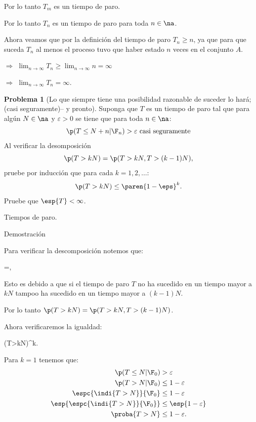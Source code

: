 \documentclass[a5paper,oneside]{amsart}
\theoremstyle{plain}
\theoremstyle{definition}
\newtheorem{problema}{Problema}
\begin{document}
Por lo tanto $T_m$ es un tiempo de paro.

Por lo tanto $T_n$ es un tiempo de paro para toda $n\in \na$.

Ahora veamos que por la definici\'on del tiempo de paro $T_n\geq n$, ya que para que suceda  $T_n$ al menos el  proceso tuvo que haber estado $n$ veces en el conjunto $A$.

$\Rightarrow$ $\lim_{n\rightarrow \infty} T_n \geq \lim_{n\rightarrow \infty} n=\infty$

$\Rightarrow$ $\lim_{n\rightarrow \infty} T_n =\infty$.

\begin{problema}[Lo que siempre tiene una posibilidad razonable de suceder lo har\'a; (casi seguramente)-- y pronto]

Suponga que \(T\) es un tiempo de paro tal que para alg\'un \(N\in\na\) y \(\varepsilon>0\) se tiene que para toda \(n\in\na\):
 $$
 \p (T\leq N+ n|\F_n)>\varepsilon \text{ casi seguramente}
 $$
Al verificar la desomposici\'on
 $$
\p (T>kN)= \p (T>kN,T>(k-1)N),
 $$pruebe por inducci\'on que para cada \(k=1,2,\ldots\):
 $$
\p (T>kN)\leq \paren{1-\eps}^k. 
 $$Pruebe que \( \esp{T}<\infty \).
 
  Tiempos de paro.
\end{problema}

Demostraci\'on

Para verificar la descomposici\'on notemos que:
\begin{esn}
=,
\end{esn}

Esto es debido a que si el tiempo de paro $T$ no ha sucedido en un tiempo mayor a $kN$ tampoo ha sucedido en un tiempo mayor a $(k-1)N$.

Por lo tanto $\p (T>kN)= \p (T>kN,T>(k-1)N)$.

Ahora verificaremos la igualdad:
\begin{esn}
\p (T>kN)\leq {}^k.
\end{esn}

Para $k=1$ tenemos que:
\begin{align}
\p (T\leq N|\F_0) &>\varepsilon \notag \\
\p (T> N|\F_0)&\leq 1-\varepsilon \notag \\
\espc{\indi{T> N}}{\F_0} &\leq  1-\varepsilon \notag \\
\esp{\espc{\indi{T> N}}{\F_0}} &\leq \esp{ 1-\varepsilon} \notag \\
\proba{T> N} &\leq 1-\varepsilon. \notag
\end{align}
\end{document}
